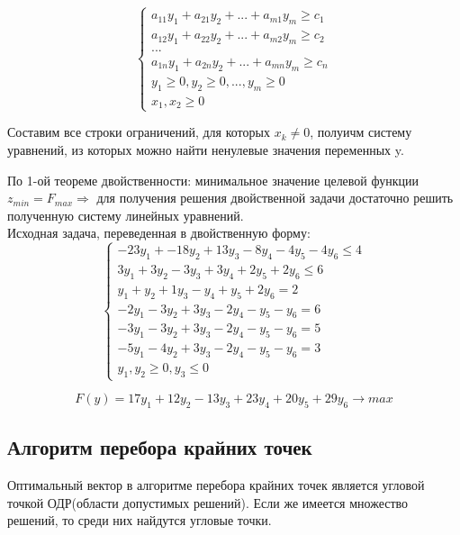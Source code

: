\documentclass{article}
\begin{document}
     \begin{equation*}
     \begin{cases}
      a_{11}y_1 + a_{21}y_2 + ... + a_{m1}y_m \ge c_1
      \\
      a_{12}y_1 + a_{22}y_2 + ... + a_{m2}y_m \ge c_2
       \\
       ...
       \\
       a_{1n}y_1 + a_{2n}y_2 + ... + a_{mn}y_m \ge c_n
       \\
       y_1 \ge 0, y_2 \ge 0, ..., y_m \ge 0
       \\
       x_1, x_2  \ge 0
     \end{cases}
    \end{equation*}

    Составим все строки ограничений, для которых $x_k \neq 0$, полуичм систему уравнений, из которых можно найти ненулевые значения переменных y.

    По 1-ой теореме двойственности: минимальное значение целевой функции $z_{min} = F_{max} \Rightarrow$ для получения решения двойственной задачи достаточно решить полученную систему линейных уравнений.\\

    Исходная задача, переведенная в двойственную форму:
\begin{equation*}
    \begin{cases}
      -23y_1 + -18y_2 + 13y_3 - 8y_4 - 4y_5 - 4y_6\leq 4
      \\
      3y_1 + 3y_2 - 3y_3 + 3y_4 + 2y_5 + 2y_6\leq 6
       \\
       y_1 + y_2 + 1y_3 - y_4 + y_5 +2y_6 = 2
       \\
       -2y_1 - 3y_2 + 3y_3 - 2y_4 - y_5 - y_6 = 6
       \\
       -3y_1 - 3y_2 + 3y_3 - 2y_4 - y_5 - y_6 = 5
       \\
       -5y_1 - 4y_2 + 3y_3 - 2y_4 - y_5 -y_6 = 3
       \\
       y_1, y_2 \geq 0, y_3 \leq 0
     \end{cases}
 \end{equation*}

 \begin{equation}\label{eq:goal}
    F(y) =  17y_1 + 12y_2 - 13y_3 + 23y_4 + 20y_5 + 29y_6\longrightarrow max
 \end{equation}

    \subsection{Алгоритм перебора крайних точек}
    Оптимальный вектор в алгоритме перебора крайних точек является угловой точкой ОДР(области допустимых решений). Если же имеется множество решений, то среди них найдутся угловые точки.
\end{document}
